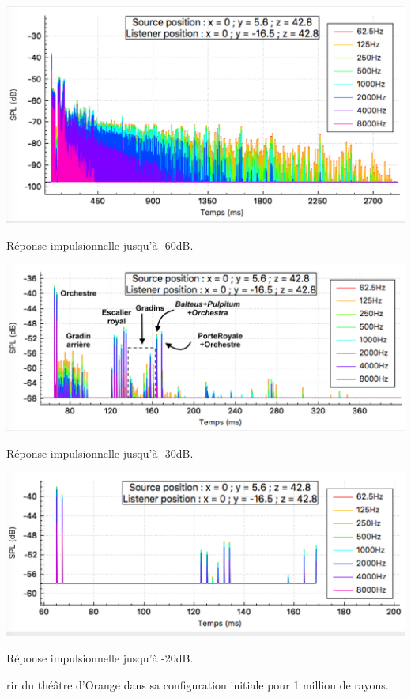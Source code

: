 \begin{figureth}
	\begin{subfigureth}{\linewidth}
		\includegraphics[width=\linewidth]{images/rirTheatreAvecDecor}
			\caption{Réponse impulsionnelle jusqu'à -60dB.}
		\label{rirTheatre60}
	\end{subfigureth}
	\begin{subfigureth}{\linewidth}
		\includegraphics[width=\linewidth]{images/rirTheatre30bis}
		\caption{Réponse impulsionnelle jusqu'à -30dB.}
		\label{rirTheatre30}
	\end{subfigureth}
		\begin{subfigureth}{\linewidth}
		\includegraphics[width=\linewidth]{images/rirTheatre20}
		\caption{Réponse impulsionnelle jusqu'à -20dB.}
		\label{rirTheatre20}
	\end{subfigureth}
	\caption{\gls{rir} du théâtre d'Orange dans sa configuration initiale pour 1 million de rayons.}
	\label{rirTheatre}
\end{figureth}

